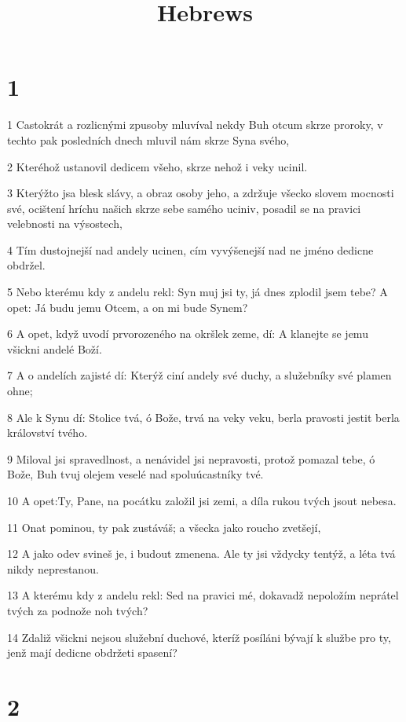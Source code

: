 

\title{Hebrews}

\chapter{1}

\par 1 Castokrát a rozlicnými zpusoby mluvíval nekdy Buh otcum skrze proroky, v techto pak posledních dnech mluvil nám skrze Syna svého,
\par 2 Kteréhož ustanovil dedicem všeho, skrze nehož i veky ucinil.
\par 3 Kterýžto jsa blesk slávy, a obraz osoby jeho, a zdržuje všecko slovem mocnosti své, ocištení hríchu našich skrze sebe samého uciniv, posadil se na pravici velebnosti na výsostech,
\par 4 Tím dustojnejší nad andely ucinen, cím vyvýšenejší nad ne jméno dedicne obdržel.
\par 5 Nebo kterému kdy z andelu rekl: Syn muj jsi ty, já dnes zplodil jsem tebe? A opet: Já budu jemu Otcem, a on mi bude Synem?
\par 6 A opet, když uvodí prvorozeného na okršlek zeme, dí: A klanejte se jemu všickni andelé Boží.
\par 7 A o andelích zajisté dí: Kterýž ciní andely své duchy, a služebníky své plamen ohne;
\par 8 Ale k Synu dí: Stolice tvá, ó Bože, trvá na veky veku, berla pravosti jestit berla království tvého.
\par 9 Miloval jsi spravedlnost, a nenávidel jsi nepravosti, protož pomazal tebe, ó Bože, Buh tvuj olejem veselé nad spoluúcastníky tvé.
\par 10 A opet:Ty, Pane, na pocátku založil jsi zemi, a díla rukou tvých jsout nebesa.
\par 11 Onat pominou, ty pak zustáváš; a všecka jako roucho zvetšejí,
\par 12 A jako odev svineš je, i budout zmenena. Ale ty jsi vždycky tentýž, a léta tvá nikdy neprestanou.
\par 13 A kterému kdy z andelu rekl: Sed na pravici mé, dokavadž nepoložím neprátel tvých za podnože noh tvých?
\par 14 Zdaliž všickni nejsou služební duchové, kteríž posíláni bývají k službe pro ty, jenž mají dedicne obdržeti spasení?

\chapter{2}

